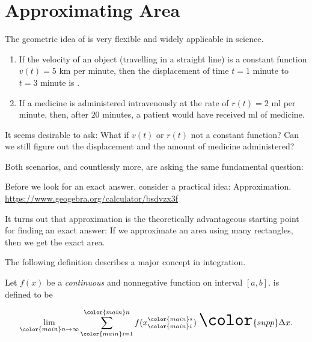 \documentclass[../main.tex]{subfiles}
\begin{document}
 \section{Approximating Area}
  The geometric idea of  is very flexible and widely applicable in science.  

  \begin{enumerate}[wide]
    \item If the velocity of an object (travelling in a straight line) is a constant function \(v(t) = 5\) km per minute, then the displacement of time \(t = 1\) minute to \(t = 3\) minute is \underline{\hspace{2in}}.

    \item If a medicine is administered intravenously at the rate of \(r(t) = 2\) ml per minute, then, after \(20\) minutes, a patient would have received \underline{\hspace{3in}} ml of medicine.
  \end{enumerate}

  It seems desirable to ask: What if \(v(t)\) or \(r(t)\) not a constant function? Can we still figure out the displacement and the amount of medicine administered?

  Both scenarios, and countlessly more, are asking the same fundamental  question:

  
  Before we look for an exact answer, consider a practical idea: Approximation. \\
  \url{https://www.geogebra.org/calculator/bsdvzx3f}

  It turns out that approximation is the theoretically advantageous starting point for finding an exact answer: If we approximate an area using \underline{\hspace{2in}} many rectangles, then we get the exact area.
  
  The following definition describes a major concept in integration. 

  \begin{mdframed}[style=withref-compact]
    Let \(f(x)\) be a \emph{continuous} and nonnegative function on interval \([a,b]\).  is defined to be
    
    \begin{equation} \label{eq:area-under-the-curve} \huge
      \lim_{{\color{main}n} \to \infty} \sum_{{\color{main}i}=1}^{{\color{main}n}} f(x_{{\color{main}i}}^{{\color{main}*}}) \; {\color{supp} \Delta x}.
    \end{equation}

  \end{mdframed}
\end{document}
